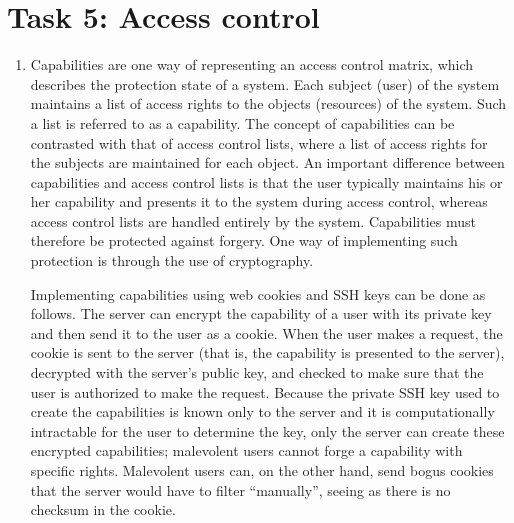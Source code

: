 \section*{Task 5: Access control}
\begin{enumerate}
\item %
  Capabilities are one way of representing an access control matrix, which describes the protection state of a system. Each subject (user) of the system maintains a list of access rights to the objects (resources) of the system. Such a list is referred to as a capability. The concept of capabilities can be contrasted with that of access control lists, where a list of access rights for the subjects are maintained for each object. An important difference between capabilities and access control lists is that the user typically maintains his or her capability and presents it to the system during access control, whereas access control lists are handled entirely by the system. Capabilities must therefore be protected against forgery. One way of implementing such protection is through the use of cryptography.\cite{bishop02}

Implementing capabilities using web cookies and SSH keys can be done as follows. The server can encrypt the capability of a user with its private key and then send it to the user as a cookie. When the user makes a request, the cookie is sent to the server (that is, the capability is presented to the server), decrypted with the server's public key, and checked to make sure that the user is authorized to make the request. Because the private SSH key used to create the capabilities is known only to the server and it is computationally intractable for the user to determine the key, only the server can create these encrypted capabilities; malevolent users cannot forge a capability with specific rights. Malevolent users can, on the other hand, send bogus cookies that the server would have to filter ``manually'', seeing as there is no checksum in the cookie.


\end{enumerate}
